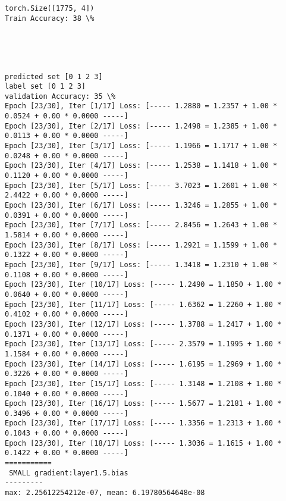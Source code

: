 \documentclass[11pt]{article}
\begin{document}
    \begin{Verbatim}[commandchars=\\\{\}]
torch.Size([1775, 4])
Train Accuracy: 38 \%

    \end{Verbatim}

    \begin{center}
    \end{center}
    { \hspace*{\fill} \\}
    
    \begin{center}
    \end{center}
    { \hspace*{\fill} \\}
    
    \begin{Verbatim}[commandchars=\\\{\}]
predicted set [0 1 2 3]
label set [0 1 2 3]
validation Accuracy: 35 \%
Epoch [23/30], Iter [1/17] Loss: [----- 1.2880 = 1.2357 + 1.00 * 0.0524 + 0.00 * 0.0000 -----]
Epoch [23/30], Iter [2/17] Loss: [----- 1.2498 = 1.2385 + 1.00 * 0.0113 + 0.00 * 0.0000 -----]
Epoch [23/30], Iter [3/17] Loss: [----- 1.1966 = 1.1717 + 1.00 * 0.0248 + 0.00 * 0.0000 -----]
Epoch [23/30], Iter [4/17] Loss: [----- 1.2538 = 1.1418 + 1.00 * 0.1120 + 0.00 * 0.0000 -----]
Epoch [23/30], Iter [5/17] Loss: [----- 3.7023 = 1.2601 + 1.00 * 2.4422 + 0.00 * 0.0000 -----]
Epoch [23/30], Iter [6/17] Loss: [----- 1.3246 = 1.2855 + 1.00 * 0.0391 + 0.00 * 0.0000 -----]
Epoch [23/30], Iter [7/17] Loss: [----- 2.8456 = 1.2643 + 1.00 * 1.5814 + 0.00 * 0.0000 -----]
Epoch [23/30], Iter [8/17] Loss: [----- 1.2921 = 1.1599 + 1.00 * 0.1322 + 0.00 * 0.0000 -----]
Epoch [23/30], Iter [9/17] Loss: [----- 1.3418 = 1.2310 + 1.00 * 0.1108 + 0.00 * 0.0000 -----]
Epoch [23/30], Iter [10/17] Loss: [----- 1.2490 = 1.1850 + 1.00 * 0.0640 + 0.00 * 0.0000 -----]
Epoch [23/30], Iter [11/17] Loss: [----- 1.6362 = 1.2260 + 1.00 * 0.4102 + 0.00 * 0.0000 -----]
Epoch [23/30], Iter [12/17] Loss: [----- 1.3788 = 1.2417 + 1.00 * 0.1371 + 0.00 * 0.0000 -----]
Epoch [23/30], Iter [13/17] Loss: [----- 2.3579 = 1.1995 + 1.00 * 1.1584 + 0.00 * 0.0000 -----]
Epoch [23/30], Iter [14/17] Loss: [----- 1.6195 = 1.2969 + 1.00 * 0.3226 + 0.00 * 0.0000 -----]
Epoch [23/30], Iter [15/17] Loss: [----- 1.3148 = 1.2108 + 1.00 * 0.1040 + 0.00 * 0.0000 -----]
Epoch [23/30], Iter [16/17] Loss: [----- 1.5677 = 1.2181 + 1.00 * 0.3496 + 0.00 * 0.0000 -----]
Epoch [23/30], Iter [17/17] Loss: [----- 1.3356 = 1.2313 + 1.00 * 0.1043 + 0.00 * 0.0000 -----]
Epoch [23/30], Iter [18/17] Loss: [----- 1.3036 = 1.1615 + 1.00 * 0.1422 + 0.00 * 0.0000 -----]
===========
 SMALL gradient:layer1.5.bias
---------
max: 2.25612254212e-07, mean: 6.19780564648e-08

    \end{Verbatim}
\end{document}
